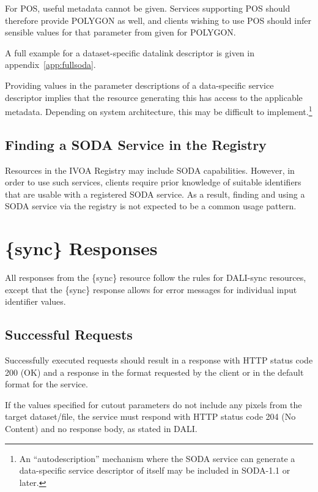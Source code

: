 \documentclass[11pt,a4paper]{ivoa}
\begin{document}
For POS, useful metadata cannot be given.  Services supporting POS
should therefore provide POLYGON as well, and clients wishing to
use POS should infer sensible values for that parameter from
 given for POLYGON.

A full example for a dataset-specific datalink descriptor is given in
appendix~\ref{app:fullsoda}.
 
Providing values in the parameter descriptions of a data-specific
service descriptor implies that the resource generating this has access
to the applicable metadata. Depending on system architecture, this may be
difficult to implement.\footnote{An ``autodescription'' mechanism where the SODA
service can generate a data-specific service descriptor of itself
may be included in SODA-1.1 or later.}

\subsection{Finding a SODA Service in the Registry}
\label{sec:reg-soda}

Resources in the IVOA Registry may include SODA capabilities. However, 
in order to
use such services, clients require prior knowledge of suitable
identifiers that are usable with a registered SODA service. As a result,
finding and
using a SODA service via the registry is not expected to be a common
usage pattern. 




\section{\{sync\} Responses}

All responses from the \{sync\} resource follow the rules for
DALI-sync resources, except that the \{sync\} response allows
for error messages for individual input identifier values.

\subsection{Successful Requests}

Successfully executed requests should result in a response
with HTTP status code 200 (OK) and a response in the format
requested by the client or in the default format for the
service.

If the values specified for cutout parameters do not include
any pixels from the target dataset/file, the service must
respond with HTTP status code 204 (No Content) and no
response body, as stated in DALI.
\end{document}
